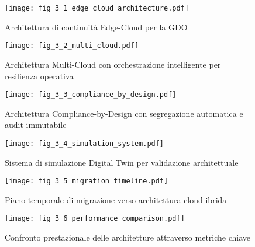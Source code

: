 
\usepackage{graphicx}
\graphicspath{{./figure/}}


\begin{figure}[htbp]
\centering
\texttt{[image: fig\_3\_1\_edge\_cloud\_architecture.pdf]}
\caption{Architettura di continuità Edge-Cloud per la GDO}
\label{fig:edge-cloud}
\end{figure}

\begin{figure}[htbp]
\centering
\texttt{[image: fig\_3\_2\_multi\_cloud.pdf]}
\caption{Architettura Multi-Cloud con orchestrazione intelligente per resilienza operativa}
\label{fig:multi-cloud}
\end{figure}

\begin{figure}[htbp]
\centering
\texttt{[image: fig\_3\_3\_compliance\_by\_design.pdf]}
\caption{Architettura Compliance-by-Design con segregazione automatica e audit immutabile}
\label{fig:compliance-design}
\end{figure}

\begin{figure}[htbp]
\centering
\texttt{[image: fig\_3\_4\_simulation\_system.pdf]}
\caption{Sistema di simulazione Digital Twin per validazione architettuale}
\label{fig:simulation-system}
\end{figure}

\begin{figure}[htbp]
\centering
\texttt{[image: fig\_3\_5\_migration\_timeline.pdf]}
\caption{Piano temporale di migrazione verso architettura cloud ibrida}
\label{fig:migration-timeline}
\end{figure}

\begin{figure}[htbp]
\centering
\texttt{[image: fig\_3\_6\_performance\_comparison.pdf]}
\caption{Confronto prestazionale delle architetture attraverso metriche chiave}
\label{fig:performance-comparison}
\end{figure}

